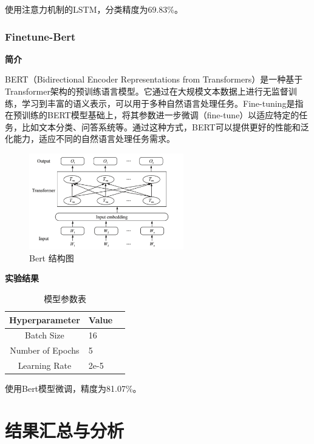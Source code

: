\documentclass[hyperref,a4paper,UTF8]{ctexart}
\begin{document}
使用注意力机制的LSTM，分类精度为69.83\%。


\subsubsection{Finetune-Bert}
\textbf{简介}


BERT（Bidirectional Encoder Representations from Transformers）是一种基于Transformer架构的预训练语言模型。它通过在大规模文本数据上进行无监督训练，学习到丰富的语义表示，可以用于多种自然语言处理任务。Fine-tuning是指在预训练的BERT模型基础上，将其参数进一步微调（fine-tune）以适应特定的任务，比如文本分类、问答系统等。通过这种方式，BERT可以提供更好的性能和泛化能力，适应不同的自然语言处理任务需求。\cite{DBLP:journals/access/UvegesR23}

\newpage

\begin{figure}[ht]
	\centering
	\includegraphics[width=0.6\textwidth]{fig/pic5.png}
	\caption{Bert 结构图}
    \label{fig:example}
\end{figure}

\textbf{实验结果}

\begin{table}[ht]
    \centering
    \begin{tabular}{c|lr}
        \toprule
        \textbf{Hyperparameter} & \textbf{Value} \\
        \midrule
        Batch Size & 16 \\
        Number of Epochs & 5 \\
        Learning Rate & 2e-5 \\
        \bottomrule
    \end{tabular}
    \caption{模型参数表}
    \label{tab:hyperparameters}
\end{table}

使用Bert模型微调，精度为81.07\%。


\section{结果汇总与分析}
\end{document}

